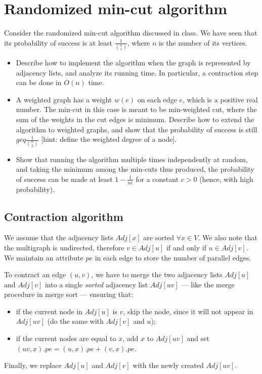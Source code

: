 \section{Randomized min-cut algorithm}

Consider the randomized min-cut algorithm discussed in class.
We have seen that its probability of success is at least $\frac{1}{{{n} \choose {1}}}$,
where $n$ is the number of its vertices.

\begin{itemize}
\item Describe how to implement the algorithm when the graph is represented by adjacency
lists, and analyze its running time.
In particular, a contraction step can be done in $O(n)$ time.
\item A weighted graph has a weight $w(e)$ on each edge $e$, which is a positive
real number.
The min-cut in this case is meant to be min-weighted cut, where the sum of the weights
in the cut edges is minimum.
Describe how to extend the algorithm to weighted graphs, and show that the probability
of success is still $geq \frac{1}{{{n} \choose {2}}}$ [hint: define the weighted degree
of a node].
\item Show that running the algorithm multiple times independently at random, and
taking the minimum among the min-cuts thus produced, the probability of success
can be made at least $1 - \frac{1}{nc}$ for a constant $c > 0$
(hence, with high probability).
\end{itemize}

\subsection{Contraction algorithm}

We assume that the adjacency lists $Adj[x]$ are sorted $\forall x \in V$. We also note that the multigraph is undirected, therefore $v\in Adj[u]$ if and only if $u\in Adj[v]$. We maintain an attribute $pe$ in each edge to store the number of parallel edges.

To contract an edge $(u, v)$, we have to merge the two adjacency lists $Adj[u]$ and $Adj[v]$ into a single \emph{sorted} adjacency list $Adj[uv]$ --- like the merge procedure in merge sort --- ensuring that:
\begin{itemize}
  \item if the current node in $Adj[u]$ is $v$, skip the node, since it will not appear in $Adj[uv]$ (do the same with $Adj[v]$ and $u$);
  \item if the current nodes are equal to $x$, add $x$ to $Adj[uv]$ and set $(uv, x).pe = (u,x).pe + (v,x).pe$.
\end{itemize}
Finally, we replace $Adj[u]$ and $Adj[v]$ with the newly created $Adj[uv]$.

